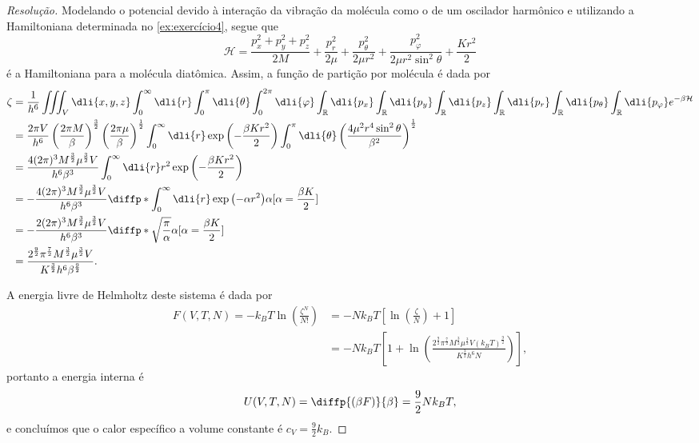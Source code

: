 \begin{proof}[Resolução]
    Modelando o potencial devido à interação da vibração da molécula como o de um oscilador harmônico e utilizando a Hamiltoniana determinada no \cref{ex:exercício4}, segue que
    \begin{equation*}
        \mathcal{H} = \frac{p_x^2 + p_y^2 + p_z^2}{2M} + \frac{p_r^2}{2\mu} + \frac{p_\theta^2}{2\mu r^2} + \frac{p_{\varphi}^2}{2\mu r^2 \sin^2\theta} + \frac{Kr^2}{2}
    \end{equation*}
    é a Hamiltoniana para a molécula diatômica. Assim, a função de partição por molécula é dada por
    \begin{align*}
        \zeta &= \frac{1}{h^6}\iiint_V \dli{x,y,z}\int_{0}^{\infty}\dli{r} \int_0^{\pi}\dli{\theta}\int_0^{2\pi} \dli{\varphi} \int_{\mathbb{R}}\dli{p_x}\int_{\mathbb{R}} \dli{p_y} \int_{\mathbb{R}}\dli{p_z}\int_{\mathbb{R}}\dli{p_r}\int_{\mathbb{R}}\dli{p_\theta} \int_{\mathbb{R}}\dli{p_{\varphi}} e^{-\beta \mathcal{H}}\\
              &= \frac{2\pi V}{h^6}\left(\frac{2\pi M}{\beta}\right)^{\frac32}\left(\frac{2\pi \mu}{\beta}\right)^{\frac12}\int_0^\infty \dli{r}\exp\left(-\frac{\beta K r^2}{2}\right)\int_0^{\pi}\dli{\theta} \left(\frac{4\mu^2r^4\sin^2\theta}{\beta^2}\right)^{\frac12}\\
              &= \frac{4(2\pi)^3M^{\frac32}\mu^{\frac32}V}{h^6\beta^3} \int_0^\infty \dli{r} r^2 \exp\left(-\frac{\beta K r^2}{2}\right)\\
              &= -\frac{4(2\pi)^3M^{\frac32}\mu^{\frac32}V}{h^6\beta^3} \diffp*{\int_0^\infty \dli{r} \exp\left(-\alpha r^2\right)}{\alpha}[\alpha = \frac{\beta K}{2}]\\
              &= -\frac{2(2\pi)^3M^{\frac32}\mu^{\frac32}V}{h^6\beta^3} \diffp*{\sqrt{\frac{\pi}{\alpha}}}{\alpha}[\alpha = \frac{\beta K}{2}]\\
              &= \frac{2^{\frac92}\pi^{\frac72}M^{\frac32}\mu^{\frac32}V}{K^{\frac32}h^6\beta^{\frac92}}.
    \end{align*}

    A energia livre de Helmholtz deste sistema é dada por
    \begin{align*}
        F(V, T, N) = -k_BT\ln\left(\frac{\zeta^N}{N!}\right)
        &= -Nk_BT \left[ \ln\left(\frac{\zeta}{N}\right) + 1\right]\\
        &= - N k_B T \left[1 + \ln\left(\frac{2^{\frac92}\pi^{\frac72}M^{\frac32}\mu^{\frac32}V(k_B T)^{\frac92}}{K^{\frac32}h^6 N}\right)\right],
    \end{align*}
    portanto a energia interna é
    \begin{equation*}
        U(V, T, N) = \diffp{(\beta F)}{\beta} = \frac92 Nk_B T,
    \end{equation*}
    e concluímos que o calor específico a volume constante é \(c_V = \frac92 k_B\).


\end{proof}
